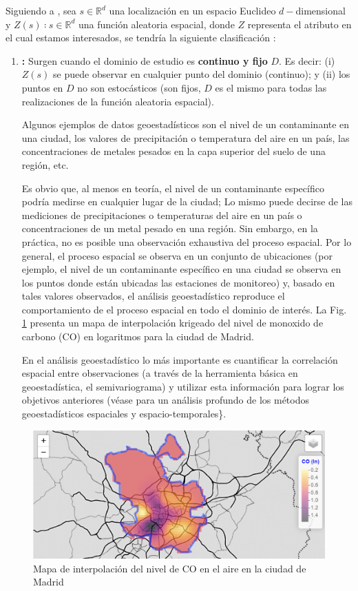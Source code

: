 \documentclass[
]{book}
\theoremstyle{definition}
\theoremstyle{definition}
\theoremstyle{definition}
\theoremstyle{definition}
\theoremstyle{remark}
\begin{document}
Siguiendo a \citet{cressie1993}, sea \(s ∈ ℝ^d\) una localización en un espacio Euclideo
\(d-\)dimensional y \({Z(s)∶ s ∈ ℝ^d}\) una función aleatoria espacial, donde \(Z\)
representa el atributo en el cual estamos interesados, se tendría la siguiente
clasificación \citep{montero_et_al_2015}:

\begin{enumerate}
\def\labelenumi{\arabic{enumi}.}
\item
  \textbf{:} Surgen cuando el dominio de estudio es \textbf{continuo
  y fijo} \(D\). Es decir: (i) \(Z(s)\) se puede observar en cualquier punto del
  dominio (continuo); y (ii) los puntos en \(D\) no son estocásticos (son fijos,
  \(D\) es el mismo para todas las realizaciones de la función aleatoria
  espacial).

  Algunos ejemplos de datos geoestadísticos son el nivel de un contaminante en
  una ciudad, los valores de precipitación o temperatura del aire en un país,
  las concentraciones de metales pesados en la capa superior del suelo de una
  región, etc.

  Es obvio que, al menos en teoría, el nivel de un contaminante específico
  podría medirse en cualquier lugar de la ciudad; Lo mismo puede decirse de
  las mediciones de precipitaciones o temperaturas del aire en un país o
  concentraciones de un metal pesado en una región. Sin embargo, en la
  práctica, no es posible una observación exhaustiva del proceso espacial. Por
  lo general, el proceso espacial se observa en un conjunto de ubicaciones
  (por ejemplo, el nivel de un contaminante específico en una ciudad se
  observa en los puntos donde están ubicadas las estaciones de monitoreo) y,
  basado en tales valores observados, el análisis geoestadístico reproduce el
  comportamiento de el proceso espacial en todo el dominio de interés. La Fig.
  \ref{fig:ejem-geo} presenta un mapa de interpolación krigeado del nivel de
  monoxido de carbono (CO) en logaritmos para la ciudad de Madrid.

  En el análisis geoestadístico lo más importante es cuantificar la
  correlación espacial entre observaciones (a través de la herramienta básica
  en geoestadística, el semivariograma) y utilizar esta información para
  lograr los objetivos anteriores (véase \citet{montero_et_al_2015} para un análisis
  profundo de los métodos geoestadísticos espaciales y espacio-temporales\}.
\end{enumerate}

\begin{figure}

{\centering \includegraphics[width=0.6\linewidth]{img/log_co_madrid} 

}

\caption{Mapa de interpolación del nivel de CO en el aire en la ciudad de Madrid}\label{fig:ejem-geo}
\end{figure}
\end{document}
